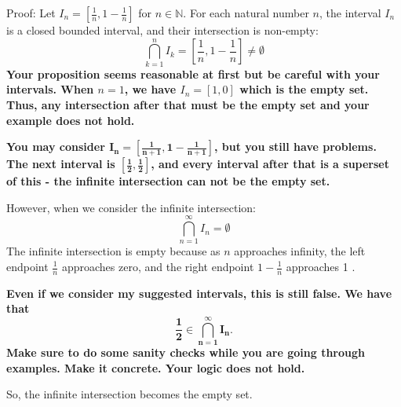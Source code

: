 \documentclass{report}
\begin{document}
Proof: Let $I_n=\left[\frac{1}{n}, 1-\frac{1}{n}\right]$ for $n \in \mathbb{N}$.
For each natural number $n$, the interval $I_n$ is a closed bounded interval, and their intersection is non-empty:
$$
\bigcap_{k=1}^n I_k=\left[\frac{1}{n}, 1-\frac{1}{n}\right] \neq \emptyset
$$
\textbf{
  Your proposition seems reasonable at first but be careful with your intervals.  When $n=1$, we have $I_n = \left[1,0 \right]$ which is the empty set. Thus, any intersection after that must be the empty set and your example does not hold.}
  \par
  \textbf{You may consider $\mathbf{I_n=\left[\frac{1}{n+1}, 1-\frac{1}{n+1} \right]}$, but you still have problems. The next interval is $\mathbf{\left[\frac{1}{2}, \frac{1}{2}\right]}$, and every interval after that is a superset of this - the infinite intersection can not be the empty set.
}
\par\bigskip
However, when we consider the infinite intersection:
$$
\bigcap_{n=1}^{\infty} I_n=\emptyset
$$
The infinite intersection is empty because as $n$ approaches infinity, the left endpoint $\frac{1}{n}$ approaches zero, and the right endpoint $1-\frac{1}{n}$ approaches 1 . 

\par
\textbf{
Even if we consider my suggested intervals, this is still false. We have that  $$\mathbf{ \frac{1}{2} \in  \bigcap_{n=1}^{\infty} I_n}.$$ Make sure to do some sanity checks while you are going through examples. Make it concrete. Your logic does not hold. 
}

So, the infinite intersection becomes the empty set.
\end{document}
